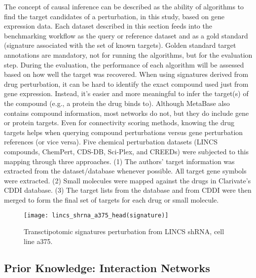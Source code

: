 The concept of causal inference can be described as the ability of algorithms to find the target candidates of a perturbation, in this study, based on gene expression data. Each dataset described in this section feeds into the benchmarking workflow as the query or reference dataset and as a gold standard (signature associated with the set of known targets). Golden standard target annotations are mandatory, not for running the algorithms, but for the evaluation step. During the evaluation, the performance of each algorithm will be assessed based on how well the target was recovered. When using signatures derived from drug perturbation, it can be hard to identify the exact compound used just from gene expression. Instead, it's easier and more meaningful to infer the target(s) of the compound (e.g., a protein the drug binds to). Although MetaBase also contains compound information, most networks do not, but they do include gene or protein targets. Even for connectivity scoring methods, knowing the drug targets helps when querying compound perturbations versus gene perturbation references (or vice versa). Five chemical perturbation datasets (LINCS compounds, ChemPert, CDS-DB, Sci-Plex, and CREEDs) were subjected to this mapping through three approaches. (1) The authors' target information was extracted from the dataset/database whenever possible. All target gene symbols were extracted. (2) Small molecules were mapped against the drugs in Clarivate's CDDI database. (3) The target lists from the database and from CDDI were then merged to form the final set of targets for each drug or small molecule.


\begin{figure}[htbp]
    \centering
    \texttt{[image: lincs\_shrna\_a375\_head(signature)]}
    \caption{Transctipotomic signatures perturbation from LINCS shRNA, cell line a375.}
    \label{fig:example_signatures}
\end{figure}



\subsection{Prior Knowledge: Interaction Networks} %
\label{sec:prior_knowledge_interaction_networks}

